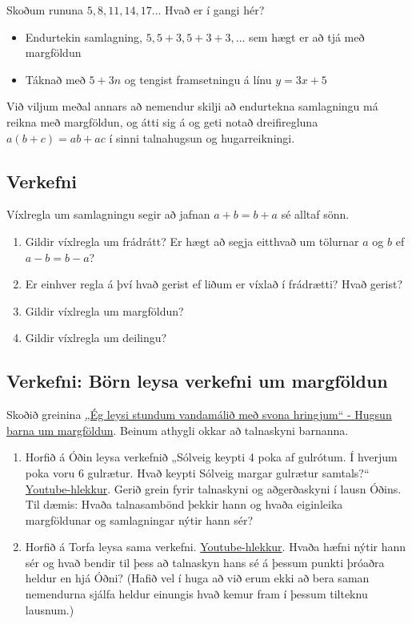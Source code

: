\documentclass[
  icelandic,
]{book}
\providecommand{\tightlist}{%
  \setlength{\itemsep}{0pt}\setlength{\parskip}{0pt}}
\begin{document}
Skoðum rununa \(5, 8, 11, 14, 17...\) Hvað er í gangi hér?

\begin{itemize}
\tightlist
\item
  Endurtekin samlagning, \(5, 5+3, 5+3+3, ...\) sem hægt er að tjá með margföldun
\item
  Táknað með \(5 + 3n\) og tengist framsetningu á línu \(y = 3x+5\)
\end{itemize}

Við viljum meðal annars að nemendur skilji að endurtekna samlagningu má reikna með margföldun, og átti sig á og geti notað dreifiregluna \(a(b+c)=ab+ac\) í sinni talnahugsun og hugarreikningi.

\subsection{Verkefni}\label{verkefni-1}

Víxlregla um samlagningu segir að jafnan \(a+b = b+a\) sé alltaf sönn.

\begin{enumerate}
\def\labelenumi{\arabic{enumi}.}
\tightlist
\item
  Gildir víxlregla um frádrátt? Er hægt að segja eitthvað um tölurnar \(a\) og \(b\) ef \(a-b = b-a\)?
\item
  Er einhver regla á því hvað gerist ef liðum er víxlað í frádrætti? Hvað gerist?
\item
  Gildir víxlregla um margföldun?
\item
  Gildir víxlregla um deilingu?
\end{enumerate}

\subsection{Verkefni: Börn leysa verkefni um margföldun}\label{verkefni-buxf6rn-leysa-verkefni-um-margfuxf6ldun}

Skoðið greinina \href{https://skolathraedir.is/2021/04/21/eg-leysi-stundum-vandamalid-med-svona-hringjum-hugsun-barna-um-margfoldun/}{„Ég leysi stundum vandamálið með svona hringjum`` - Hugsun barna um margföldun}. Beinum athygli okkar að talnaskyni barnanna.

\begin{enumerate}
\def\labelenumi{\alph{enumi}.}
\item
  Horfið á Óðin leysa verkefnið „Sólveig keypti 4 poka af gulrótum. Í hverjum poka voru 6 gulrætur. Hvað keypti Sólveig margar gulrætur samtals?{}`` \href{https://youtu.be/rqlU-PLoxOs?si=U6lG57jxB6EKkLsn}{Youtube-hlekkur}. Gerið grein fyrir talnaskyni og aðgerðaskyni í lausn Óðins. Til dæmis: Hvaða talnasambönd þekkir hann og hvaða eiginleika margföldunar og samlagningar nýtir hann sér?
\item
  Horfið á Torfa leysa sama verkefni. \href{https://youtu.be/OEZPAQegt9o?si=7VloBBZ5PemM2v_u}{Youtube-hlekkur}. Hvaða hæfni nýtir hann sér og hvað bendir til þess að talnaskyn hans sé á þessum punkti þróaðra heldur en hjá Óðni? (Hafið vel í huga að við erum ekki að bera saman nemendurna sjálfa heldur einungis hvað kemur fram í þessum tilteknu lausnum.)
\end{enumerate}
\end{document}
